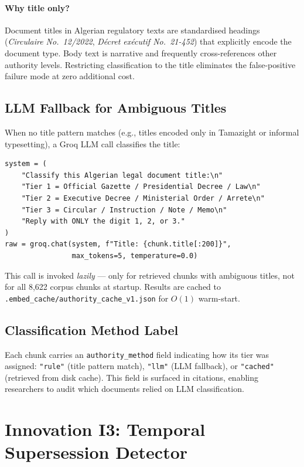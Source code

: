 \documentclass[12pt,a4paper]{article}
\begin{document}
\paragraph{Why title only?} Document titles in Algerian regulatory texts are
standardised headings (\textit{Circulaire No.~12/2022}, \textit{Décret exécutif
No.~21-452}) that explicitly encode the document type. Body text is narrative
and frequently cross-references other authority levels. Restricting classification
to the title eliminates the false-positive failure mode at zero additional cost.

\subsection{LLM Fallback for Ambiguous Titles}

When no title pattern matches (e.g., titles encoded only in Tamazight or informal
typesetting), a Groq LLM call classifies the title:

\begin{lstlisting}[style=pythonstyle,caption={LLM fallback for ambiguous titles.}]
system = (
    "Classify this Algerian legal document title:\n"
    "Tier 1 = Official Gazette / Presidential Decree / Law\n"
    "Tier 2 = Executive Decree / Ministerial Order / Arrete\n"
    "Tier 3 = Circular / Instruction / Note / Memo\n"
    "Reply with ONLY the digit 1, 2, or 3."
)
raw = groq.chat(system, f"Title: {chunk.title[:200]}",
                max_tokens=5, temperature=0.0)
\end{lstlisting}

This call is invoked \emph{lazily} — only for retrieved chunks with ambiguous titles,
not for all 8,622 corpus chunks at startup. Results are cached to
\texttt{.embed\_cache/authority\_cache\_v1.json} for $O(1)$ warm-start.

\subsection{Classification Method Label}

Each chunk carries an \texttt{authority\_method} field indicating how its tier
was assigned: \texttt{"rule"} (title pattern match), \texttt{"llm"} (LLM fallback),
or \texttt{"cached"} (retrieved from disk cache). This field is surfaced in
citations, enabling researchers to audit which documents relied on LLM classification.

\section{Innovation I3: Temporal Supersession Detector}
\label{sec:supersession}
\end{document}
